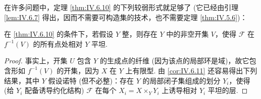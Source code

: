 在许多问题中，定理 \ref{thm:IV.6.10} 的下列较弱形式就足够了 (它已经由引理 \ref{lem:IV.6.7} 得出，因而不需要可构造集的技术，也不需要定理 \ref{thm:IV.5.6})：

\begin{corollary}\label{cor:IV.6.11}
在 \ref{thm:IV.6.10} 的条件下，若假设 $Y$ 整，则存在 $Y$ 中的非空开集 $V$，使得 $\mathcal{F}$ 在 $f^{-1}(V)$ 的所有点处相对 $Y$ 平坦.
\end{corollary}

\begin{proof}
事实上，开集 $U$ 包含 $Y$ 的生成点的纤维 (因为该点的局部环是域)，故它包含形如 $f^{-1}(V)$ 的开集，因为 $X$ 在 $Y$ 上有限型. 由 \ref{cor:IV.6.11} 还容易得出下列结果，其中 $Y$ 假设诺特 (但不必整)：存在 $Y$ 的局部闭子集组成的划分 $Y_i$，使得 (给 $Y_i$ 配备诱导约化结构) $\mathcal{F}$ 在每个 $X_i = X \times_Y Y_i$ 上诱导相对 $Y_i$ 平坦的层.
\end{proof}
